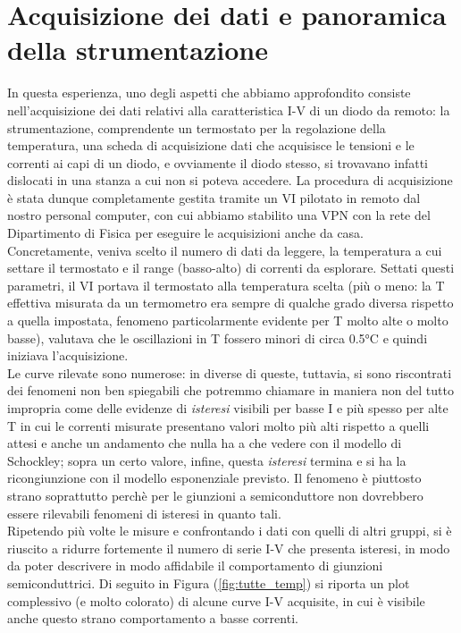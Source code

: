 \documentclass[10pt,letterpaper]{article}
\begin{document}
\section{Acquisizione dei dati e panoramica della strumentazione}
In questa esperienza, uno degli aspetti che abbiamo approfondito consiste nell'acquisizione dei dati relativi alla caratteristica I-V di un diodo da remoto: la strumentazione, comprendente un termostato per la regolazione della temperatura, una scheda di acquisizione dati che acquisisce le tensioni e le correnti ai capi di un diodo, e ovviamente il diodo stesso, si trovavano infatti dislocati in una stanza a cui non si poteva accedere. La procedura di acquisizione è stata dunque completamente gestita tramite un VI pilotato in remoto dal nostro personal computer, con cui abbiamo stabilito una VPN con la rete del Dipartimento di Fisica per eseguire le acquisizioni anche da casa.\\
Concretamente, veniva scelto il numero di dati da leggere, la temperatura a cui settare il termostato e il range (basso-alto) di correnti da esplorare. Settati questi parametri, il VI portava il termostato alla temperatura scelta (più o meno: la T effettiva misurata da un termometro era sempre di qualche grado diversa rispetto a quella impostata, fenomeno particolarmente evidente per T molto alte o molto basse), valutava che le oscillazioni in T fossero minori di circa 0.5°C e quindi iniziava l'acquisizione.\\

Le curve rilevate sono numerose: in diverse di queste, tuttavia, si sono riscontrati dei fenomeni non ben spiegabili che potremmo chiamare in maniera non del tutto impropria come delle evidenze di \textit{isteresi} visibili per basse I e più spesso per alte T in cui le correnti misurate presentano valori molto più alti rispetto a quelli attesi e anche un andamento che nulla ha a che vedere con il modello di Schockley; sopra un certo valore, infine, questa \textit{isteresi} termina e si ha la ricongiunzione con il modello esponenziale previsto. Il fenomeno è piuttosto strano soprattutto perchè per le giunzioni a semiconduttore non dovrebbero essere rilevabili fenomeni di isteresi in quanto tali. \\
Ripetendo più volte le misure e confrontando i dati con quelli di altri gruppi, si è riuscito a ridurre fortemente il numero di serie I-V che presenta isteresi, in modo da poter descrivere in modo affidabile il comportamento di giunzioni semiconduttrici. Di seguito in Figura (\ref{fig:tutte_temp}) si riporta un plot complessivo (e molto colorato) di alcune curve I-V acquisite, in cui è visibile anche questo strano comportamento a basse correnti.\\
\end{document}
